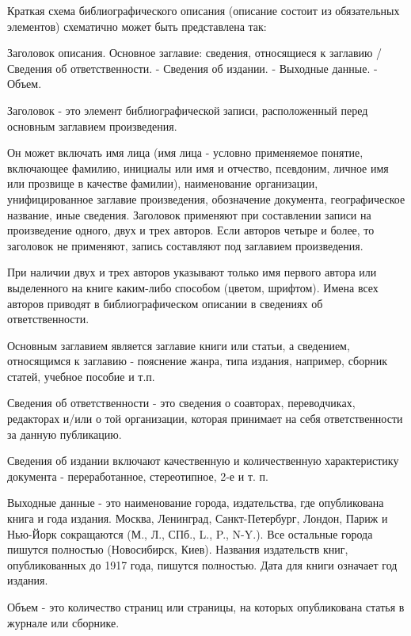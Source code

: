 Краткая схема библиографического описания (описание состоит из обязательных элементов) схематично может быть представлена так:

Заголовок описания. Основное заглавие: сведения, относящиеся к заглавию / Сведения об ответственности. - Сведения об издании. - Выходные данные. - Объем.

Заголовок - это элемент библиографической записи, расположенный перед основным заглавием произведения.

Он может включать имя лица (имя лица - условно применяемое понятие, включающее фамилию, инициалы или имя и отчество, псевдоним, личное имя или прозвище в качестве фамилии), наименование организации, унифицированное заглавие произведения, обозначение документа, географическое название, иные сведения. Заголовок применяют при составлении записи на произведение одного, двух и трех авторов. Если авторов четыре и более, то заголовок не применяют, запись составляют под заглавием произведения.

При наличии двух и трех авторов указывают только имя первого автора или выделенного на книге каким-либо способом (цветом, шрифтом). Имена всех авторов приводят в библиографическом описании в сведениях об ответственности.

Основным заглавием является заглавие книги или статьи, а сведением, относящимся к заглавию - пояснение жанра, типа издания, например, сборник статей, учебное пособие и т.п.

Сведения об ответственности - это сведения о соавторах, переводчиках, редакторах и/или о той организации, которая принимает на себя ответственности за данную публикацию.

Сведения об издании включают качественную и количественную характеристику документа - переработанное, стереотипное, 2-е и т. п.

Выходные данные - это наименование города, издательства, где опубликована книга и года издания. Москва, Ленинград, Санкт-Петербург, Лондон, Париж и Нью-Йорк сокращаются (М., Л., СПб., L., P., N-Y.). Все остальные города пишутся полностью (Новосибирск, Киев). Названия издательств книг, опубликованных до 1917 года, пишутся полностью. Дата для книги означает год издания.

Объем - это количество страниц или страницы, на которых опубликована статья в журнале или сборнике.

